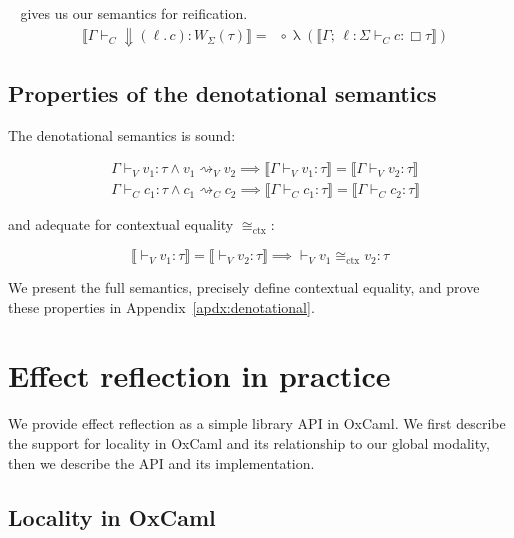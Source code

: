 \documentclass[acmsmall, screen, review, anonymous]{acmart}
\theoremstyle{definition}
\newcommand{\glob}{\mathop{\Box}}
\newcommand{\sem}[1]{\llbracket #1 \rrbracket}
\newcommand{\reifyname}{\Downarrow}
\newcommand{\reify}[2]{\mathop{\reifyname}(#1.\,#2)}
\newcommand{\reifyc}[2]{\mathop{\reifyname_{#1 #2}}}
\newcommand{\loc}{\ell}
\newcommand{\ind}[1]{W_{#1}}
\newcommand{\types}{\mathrel{:}}
\newcommand{\ccons}[2]{#1;\,#2}
\newcommand{\lbind}[3]{\ccons{#1}{#2\types#3}}
\newcommand{\turnv}{\mathrel{\vdash_V}}
\newcommand{\turnc}{\mathrel{\vdash_C}}
\newcommand{\currying}[1]{\mathop{\lambda}(#1)}
\newcommand{\stepstoname}{\rightsquigarrow}
\newcommand{\stepstov}{\stepstoname_V}
\newcommand{\stepstoc}{\stepstoname_C}
\newcommand{\ctxeq}{\cong_{\mathrm{ctx}}}
\begin{document}
$\reifyc{\Sigma}{}$ gives us our semantics for reification.
\begin{align*}
&\sem{\Gamma \turnc \reify{\loc}{c} \types \ind{\Sigma}(\tau)} =
  \reifyc{\Sigma}{\sem{\tau}} \circ \currying{\sem{\lbind{\Gamma}{\loc}{\Sigma} \turnc c \types \glob \tau}}
\end{align*}

\subsection{Properties of the denotational semantics}

The denotational semantics is sound:
\begin{theorem}
\label{lemma:soundness}
  \begin{align*}
    &\Gamma \turnv v_1 \types \tau
    \wedge v_1 \stepstov v_2
    \implies \sem{\Gamma \turnv v_1 \types \tau}
           = \sem{\Gamma \turnv v_2 \types \tau} \\
    &\Gamma \turnc c_1 \types \tau
    \wedge c_1 \stepstoc c_2
    \implies \sem{\Gamma \turnc c_1 \types \tau}
           = \sem{\Gamma \turnc c_2 \types \tau}
  \end{align*}
\end{theorem}
and adequate for contextual equality $\ctxeq$:
\begin{theorem}
\label{lemma:adequacy}
  \begin{equation*}
    \sem{\turnv v_1 \types \tau} = \sem{\turnv v_2 \types \tau}
    \implies \turnv v_1 \ctxeq v_2 \types \tau
  \end{equation*}
\end{theorem}

We present the full semantics, precisely define contextual equality, and
prove these properties in Appendix~\ref{apdx:denotational}.

\section{Effect reflection in practice}
\label{sec:practice}

We provide effect reflection as a simple library API in OxCaml. We first
describe the support for locality in OxCaml and its relationship to our
global modality, then we describe the API and its implementation.

\subsection{Locality in OxCaml}
\label{sec:locality}
\end{document}
